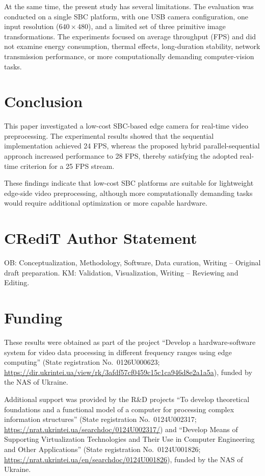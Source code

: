 \documentclass[
]{ceurart}
\begin{document}
At the same time, the present study has several limitations. The evaluation was conducted on a single SBC platform, with one USB camera configuration, one input resolution ($640 \times 480$), and a limited set of three primitive image transformations. The experiments focused on average throughput (FPS) and did not examine energy consumption, thermal effects, long-duration stability, network transmission performance, or more computationally demanding computer-vision tasks.

\section{Conclusion}

This paper investigated a low-cost SBC-based edge camera for real-time video preprocessing. The experimental results showed that the sequential implementation achieved 24 FPS, whereas the proposed hybrid parallel-sequential approach increased performance to 28 FPS, thereby satisfying the adopted real-time criterion for a 25 FPS stream.

These findings indicate that low-cost SBC platforms are suitable for lightweight edge-side video preprocessing, although more computationally demanding tasks would require additional optimization or more capable hardware.

\section{CRediT Author Statement}

OB: Conceptualization, Methodology, Software, Data curation, Writing -- Original draft preparation. KM: Validation, Visualization, Writing -- Reviewing and Editing.

\section*{Funding}

These results were obtained as part of the project “Develop a hardware-software system for video data processing in different frequency ranges using edge computing” (State registration No.~0126U000623; \url{https://dir.ukrintei.ua/view/rk/3afdf57cf0459c15c1ca946d8e2a1a5a}), funded by the NAS of Ukraine.

Additional support was provided by the R\&D projects ``To develop theoretical foundations and a functional model of a computer for processing complex information structures'' (State registration No.~0124U002317; \url{https://nrat.ukrintei.ua/searchdoc/0124U002317/}) and ``Develop Means of Supporting Virtualization Technologies and Their Use in Computer Engineering and Other Applications'' (State registration No.~0124U001826; \url{https://nrat.ukrintei.ua/en/searchdoc/0124U001826}), funded by the NAS of Ukraine.
\end{document}
